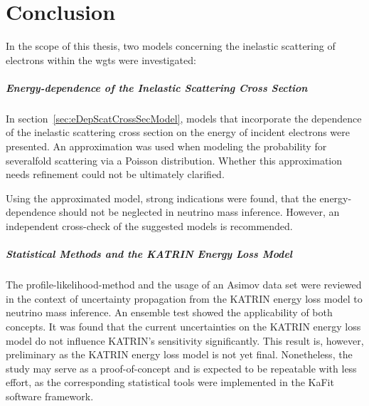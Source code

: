 \chapter{Conclusion}
\label{sec:conclusion}
In the scope of this thesis, two models concerning the inelastic scattering of electrons within the \gls{wgts} were investigated:

\paragraph{Energy-dependence of the Inelastic Scattering Cross Section}
In section~\ref{sec:eDepScatCrossSecModel}, models that incorporate the dependence of the inelastic scattering cross section on the energy of incident electrons were presented. An approximation was used when modeling the probability for severalfold scattering via a Poisson distribution. Whether this approximation needs refinement could not be ultimately clarified.

Using the approximated model, strong indications were found, that the energy-dependence should not be neglected in neutrino mass inference. However, an independent cross-check of the suggested models is recommended.

\paragraph{Statistical Methods and the KATRIN Energy Loss Model}
The profile-likelihood-method and the usage of an Asimov data set were reviewed in the context of uncertainty propagation from the KATRIN energy loss model to neutrino mass inference. An ensemble test showed the applicability of both concepts. It was found that the current uncertainties on the KATRIN energy loss model do not influence KATRIN's sensitivity significantly. This result is, however, preliminary as the KATRIN energy loss model is not yet final. Nonetheless, the study may serve as a proof-of-concept and is expected to be repeatable with less effort, as the corresponding statistical tools were implemented in the KaFit software framework. 
